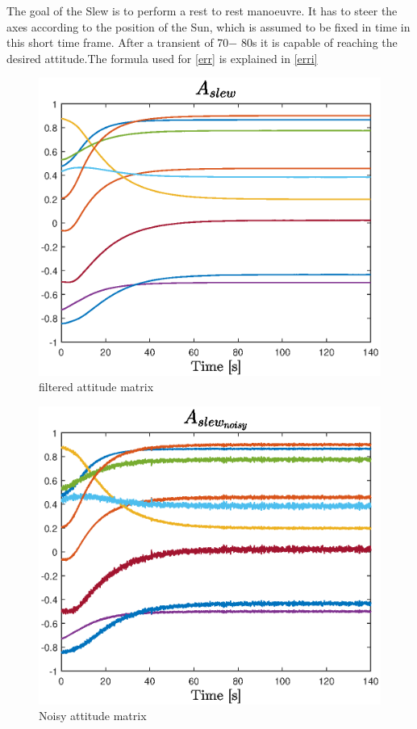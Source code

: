 \documentclass[11pt]{article}
\begin{document}
The goal of the Slew is to perform a rest to rest manoeuvre. It has to steer the axes according to the position of the Sun, which is assumed to be fixed in time in this short time frame. After a transient of 70$-$ 80s it is capable of reaching the desired attitude.The formula used for \ref{err} is explained in \ref{erri}\\
\begin{minipage}{.45\textwidth}
\begin{figure} [H]
\centering 
\includegraphics[scale=0.55]{A_slew_s.eps}
\caption{  filtered attitude matrix }
\label{as}
\end{figure}
\end{minipage}
\begin{minipage}{.55\textwidth}

\begin{figure} [H]
\centering 
\includegraphics[scale=0.55]{A_slew_n.eps}
\caption{ Noisy attitude matrix }
\label{asn}
\end{figure}
\end{minipage}\\\\
\end{document}
